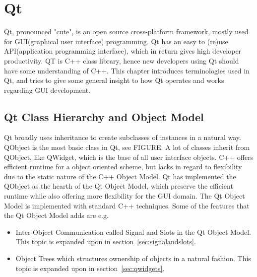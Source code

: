 \section{Qt}
Qt, pronounced "cute", is an open source cross-platform framework, mostly used for GUI(graphical user interface) programming. Qt has an easy to (re)use API(application programming interface), which in return gives high developer productivity. QT is C++ class library, hence new developers using Qt should have some understanding of C++.
This chapter introduces terminologies used in Qt, and tries to give some general insight to how Qt operates and works regarding GUI development.  




\subsection{Qt Class Hierarchy and Object Model}
\label{sec:QtClassHierarchyAndObjectModel}
Qt broadly uses inheritance to create subclasses of instances in a natural way. QObject is the most basic class in Qt, see FIGURE. A lot of classes inherit from QObject, like QWidget, which is the base of all user interface objects. 
C++ offers efficient runtime for a object oriented scheme, but lacks in regard to flexibility due to the static nature of the C++ Object Model. Qt has implemented the QObject as the hearth of the Qt Object Model, which preserve the efficient runtime while also offering more flexibility for the GUI domain. The Qt Object Model is implemented with standard C++ techniques. Some of the features that the Qt Object Model adds are e.g.

\begin{itemize}
\item Inter-Object Communication called Signal and Slots in the Qt Object Model. This topic is expanded upon in section~\ref{sec:signalandslots}.
\item Object Trees which structures ownership of objects in a natural fashion. This topic is expanded upon in section~\ref{sec:qwidgets}.
\end{itemize}


